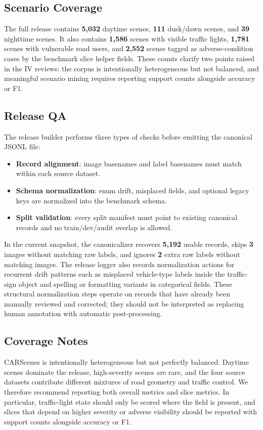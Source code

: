 \subsection{Scenario Coverage}
The full release contains \textbf{5,032} daytime scenes, \textbf{111} dusk/dawn scenes, and \textbf{39} nighttime scenes. It also contains \textbf{1,586} scenes with visible traffic lights, \textbf{1,781} scenes with vulnerable road users, and \textbf{2,552} scenes tagged as adverse-condition cases by the benchmark slice helper fields. These counts clarify two points raised in the IV reviews: the corpus is intentionally heterogeneous but not balanced, and meaningful scenario mining requires reporting support counts alongside accuracy or F1.

\subsection{Release QA}
The release builder performs three types of checks before emitting the canonical JSONL file:
\begin{itemize}
  \item \textbf{Record alignment}: image basenames and label basenames must match within each source dataset.
  \item \textbf{Schema normalization}: enum drift, misplaced fields, and optional legacy keys are normalized into the benchmark schema.
  \item \textbf{Split validation}: every split manifest must point to existing canonical records and no train/dev/audit overlap is allowed.
\end{itemize}

In the current snapshot, the canonicalizer recovers \textbf{5,192} usable records, skips \textbf{3} images without matching raw labels, and ignores \textbf{2} extra raw labels without matching images. The release logger also records normalization actions for recurrent drift patterns such as misplaced vehicle-type labels inside the traffic-sign object and spelling or formatting variants in categorical fields. These structural normalization steps operate on records that have already been manually reviewed and corrected; they should not be interpreted as replacing human annotation with automatic post-processing.

\subsection{Coverage Notes}
CARScenes is intentionally heterogeneous but not perfectly balanced. Daytime scenes dominate the release, high-severity scenes are rare, and the four source datasets contribute different mixtures of road geometry and traffic control. We therefore recommend reporting both overall metrics and slice metrics. In particular, traffic-light state should only be scored where the field is present, and slices that depend on higher severity or adverse visibility should be reported with support counts alongside accuracy or F1.

